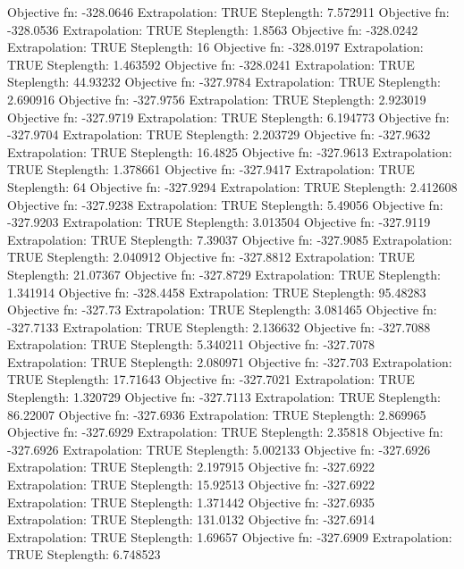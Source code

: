 \documentclass{article}
\begin{document}
\begin{Schunk}
\begin{Soutput}
Objective fn:  -328.0646   Extrapolation:  TRUE   Steplength:  7.572911 
Objective fn:  -328.0536   Extrapolation:  TRUE   Steplength:  1.8563 
Objective fn:  -328.0242   Extrapolation:  TRUE   Steplength:  16 
Objective fn:  -328.0197   Extrapolation:  TRUE   Steplength:  1.463592 
Objective fn:  -328.0241   Extrapolation:  TRUE   Steplength:  44.93232 
Objective fn:  -327.9784   Extrapolation:  TRUE   Steplength:  2.690916 
Objective fn:  -327.9756   Extrapolation:  TRUE   Steplength:  2.923019 
Objective fn:  -327.9719   Extrapolation:  TRUE   Steplength:  6.194773 
Objective fn:  -327.9704   Extrapolation:  TRUE   Steplength:  2.203729 
Objective fn:  -327.9632   Extrapolation:  TRUE   Steplength:  16.4825 
Objective fn:  -327.9613   Extrapolation:  TRUE   Steplength:  1.378661 
Objective fn:  -327.9417   Extrapolation:  TRUE   Steplength:  64 
Objective fn:  -327.9294   Extrapolation:  TRUE   Steplength:  2.412608 
Objective fn:  -327.9238   Extrapolation:  TRUE   Steplength:  5.49056 
Objective fn:  -327.9203   Extrapolation:  TRUE   Steplength:  3.013504 
Objective fn:  -327.9119   Extrapolation:  TRUE   Steplength:  7.39037 
Objective fn:  -327.9085   Extrapolation:  TRUE   Steplength:  2.040912 
Objective fn:  -327.8812   Extrapolation:  TRUE   Steplength:  21.07367 
Objective fn:  -327.8729   Extrapolation:  TRUE   Steplength:  1.341914 
Objective fn:  -328.4458   Extrapolation:  TRUE   Steplength:  95.48283 
Objective fn:  -327.73   Extrapolation:  TRUE   Steplength:  3.081465 
Objective fn:  -327.7133   Extrapolation:  TRUE   Steplength:  2.136632 
Objective fn:  -327.7088   Extrapolation:  TRUE   Steplength:  5.340211 
Objective fn:  -327.7078   Extrapolation:  TRUE   Steplength:  2.080971 
Objective fn:  -327.703   Extrapolation:  TRUE   Steplength:  17.71643 
Objective fn:  -327.7021   Extrapolation:  TRUE   Steplength:  1.320729 
Objective fn:  -327.7113   Extrapolation:  TRUE   Steplength:  86.22007 
Objective fn:  -327.6936   Extrapolation:  TRUE   Steplength:  2.869965 
Objective fn:  -327.6929   Extrapolation:  TRUE   Steplength:  2.35818 
Objective fn:  -327.6926   Extrapolation:  TRUE   Steplength:  5.002133 
Objective fn:  -327.6926   Extrapolation:  TRUE   Steplength:  2.197915 
Objective fn:  -327.6922   Extrapolation:  TRUE   Steplength:  15.92513 
Objective fn:  -327.6922   Extrapolation:  TRUE   Steplength:  1.371442 
Objective fn:  -327.6935   Extrapolation:  TRUE   Steplength:  131.0132 
Objective fn:  -327.6914   Extrapolation:  TRUE   Steplength:  1.69657 
Objective fn:  -327.6909   Extrapolation:  TRUE   Steplength:  6.748523 

\end{Soutput}
\end{Schunk}
\end{document}

